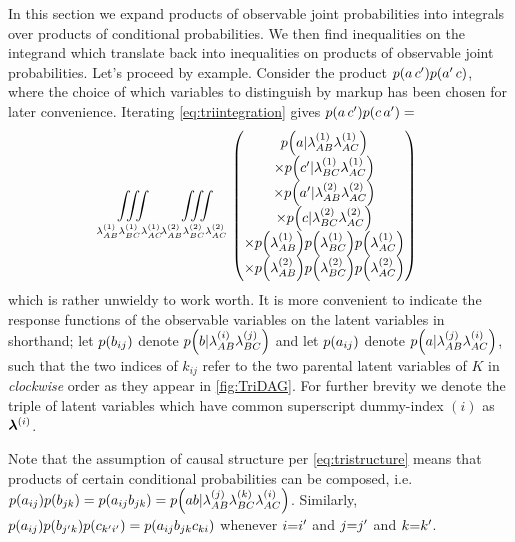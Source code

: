 \clearpage
In this section we expand products of observable joint probabilities into integrals over products of conditional probabilities. We then find inequalities on the integrand which translate back into inequalities on products of observable joint probabilities. Let's proceed by example. Consider the product $\p{a\, c'}\p{a'\,c}$, where the choice of which variables to distinguish by markup has been chosen for later convenience. Iterating \cref{eq:triintegration} gives $\p{a\, c'}\p{c\, a'}=$
\begin{align*}
\iiint\limits_{{\lambda_{AB}^{(1)}\lambda_{BC}^{(1)}\lambda_{AC}^{(1)}}}\,\iiint\limits_{{\lambda_{AB}^{(2)}\lambda_{BC}^{(2)}\lambda_{AC}^{(2)}}}\,
\begin{pmatrix}
\p{a|\lambda_{AB}^{(1)}\lambda_{AC}^{(1)}}
\\\times \p{c'|\lambda_{BC}^{(1)}\lambda_{AC}^{(1)}}
\\\times \p{a'|\lambda_{AB}^{(2)}\lambda_{AC}^{(2)}}
\\\times \p{c|\lambda_{BC}^{(2)}\lambda_{AC}^{(2)}}
\\\times \p{\lambda_{AB}^{(1)}}\p{\lambda_{BC}^{(1)}} \p{\lambda_{AC}^{(1)}}
\\\times \p{\lambda_{AB}^{(2)}}\p{\lambda_{BC}^{(2)}} \p{\lambda_{AC}^{(2)}}
\end{pmatrix}
\end{align*}
which is rather unwieldy to work worth. It is more convenient to indicate the response functions of the observable variables on the latent variables in shorthand; let $\p{b_{ij}}$ denote $\p{b|\lambda_{AB}^{(i)}\lambda_{BC}^{(j)}}$ and let $\p{a_{ij}}$ denote $\p{a|\lambda_{AB}^{(j)}\lambda_{AC}^{(i)}}$, such that the two indices of $k_{ij}$ refer to the two parental latent variables of $K$ in \emph{clockwise} order as they appear in \cref{fig:TriDAG}. For further brevity we denote the triple of latent variables which have common superscript dummy-index $(i)$ as $\bm{\lambda}^{(i)}$. 

Note that the assumption of causal structure per \cref{eq:tristructure} means that products of certain conditional probabilities can be composed, i.e. $\p{a_{ij}}\p{b_{jk}}=\p{a_{ij} b_{jk}}=\p{a b|\lambda_{AB}^{(j)}\lambda_{BC}^{(k)}\lambda_{AC}^{(i)}}$. Similarly, $\p{a_{ij}}\p{b_{j'k}}\p{c_{k'i'}}=\p{a_{ij} b_{jk} c_{ki}}$ whenever $i\mathord{=}i'$ and $j\mathord{=}j'$ and $k\mathord{=}k'$.

